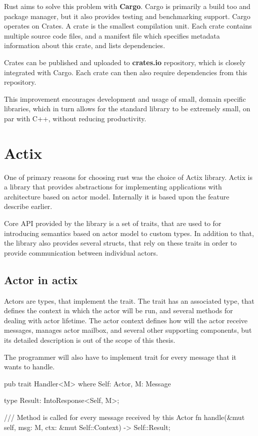 Rust aims to solve this problem with \textbf{Cargo}. Cargo is primarily a build too and package manager, but it also
provides testing and benchmarking support. Cargo operates on Crates. A crate is the smallest compilation unit.
Each crate contains multiple source code files, and a manifest file which specifies metadata information about this crate, and lists dependencies.

Crates can be published and uploaded to \textbf{crates.io} repository, which is closely integrated with Cargo. Each crate can then
also require dependencies from this repository.

This improvement encourages development and usage of small, domain specific libraries, which in
turn allows for the standard library to be extremely small, on par with C++, without reducing productivity.

\section{Actix}
One of primary reasons for choosing rust was the choice of Actix\cite{web:actix} library. Actix is a library that provides abstractions
for implementing applications with architecture based on actor model. Internally it is based upon the  feature describe earlier.

Core API provided by the library is a set of traits, that are used to for introducing semantics based on actor model to
custom types. In addition to that, the library also provides several structs, that rely on these traits in order
to provide communication between individual actors.

\subsection{Actor in actix}
Actors are types, that implement the  trait. The  trait has an associated type, that defines the context in which the actor will be run,
and several methods for dealing with actor lifetime.
The actor context defines how will the actor receive messages, manages actor mailbox, and several other
supporting components, but its detailed description is out of the scope of this thesis.

The programmer will also have to implement  trait for every message that it wants to handle.

\begin{code}[language=rust,label={handler_trait},caption={Handler trait}]
pub trait Handler<M> where Self: Actor, M: Message
{
    type Result: IntoResponse<Self, M>;

    /// Method is called for every message received by this Actor
    fn handle(&mut self, msg: M, ctx: &mut Self::Context) -> Self::Result;

}
\end{code}

